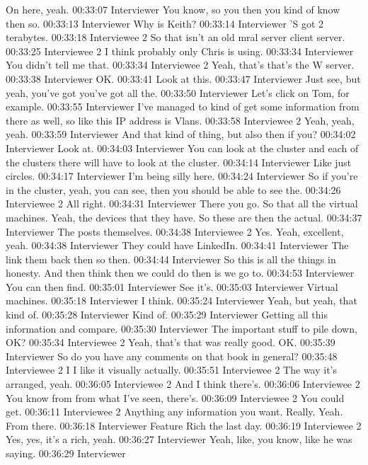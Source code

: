 On here, yeah.
00:33:07 Interviewer
You know, so you then you kind of know then so.
00:33:13 Interviewer
Why is Keith?
00:33:14 Interviewer
'S got 2 terabytes.
00:33:18 Interviewee 2 
So that isn't an old mral server client server.
00:33:25 Interviewee 2 
I think probably only Chris is using.
00:33:34 Interviewer
You didn't tell me that.
00:33:34 Interviewee 2 
Yeah, that's that's the W server.
00:33:38 Interviewer
OK.
00:33:41
Look at this.
00:33:47 Interviewer
Just see, but yeah, you've got you've got all the.
00:33:50 Interviewer
Let's click on Tom, for example.
00:33:55 Interviewer
I've managed to kind of get some information from there as well, so like this IP address is Vlans.
00:33:58 Interviewee 2 
Yeah, yeah, yeah.
00:33:59 Interviewer
And that kind of thing, but also then if you?
00:34:02 Interviewer
Look at.
00:34:03 Interviewer
You can look at the cluster and each of the clusters there will have to look at the cluster.
00:34:14 Interviewer
Like just circles.
00:34:17 Interviewer
I'm being silly here.
00:34:24 Interviewer
So if you're in the cluster, yeah, you can see, then you should be able to see the.
00:34:26 Interviewee 2 
All right.
00:34:31 Interviewer
There you go. So that all the virtual machines. Yeah, the devices that they have. So these are then the actual.
00:34:37 Interviewer
The posts themselves.
00:34:38 Interviewee 2 
Yes. Yeah, excellent, yeah.
00:34:38 Interviewer
They could have LinkedIn.
00:34:41 Interviewer
The link them back then so then.
00:34:44 Interviewer
So this is all the things in honesty. And then think then we could do then is we go to.
00:34:53 Interviewer
You can then find.
00:35:01 Interviewer
See it's.
00:35:03 Interviewer
Virtual machines.
00:35:18 Interviewer
I think.
00:35:24 Interviewer
Yeah, but yeah, that kind of.
00:35:28 Interviewer
Kind of.
00:35:29 Interviewer
Getting all this information and compare.
00:35:30 Interviewer
The important stuff to pile down, OK?
00:35:34 Interviewee 2 
Yeah, that's that was really good. OK.
00:35:39 Interviewer
So do you have any comments on that book in general?
00:35:48 Interviewee 2 
I I like it visually actually.
00:35:51 Interviewee 2 
The way it's arranged, yeah.
00:36:05 Interviewee 2 
And I think there's.
00:36:06 Interviewee 2 
You know from from what I've seen, there's.
00:36:09 Interviewee 2 
You could get.
00:36:11 Interviewee 2 
Anything any information you want. Really. Yeah. From there.
00:36:18 Interviewer
Feature Rich the last day.
00:36:19 Interviewee 2 
Yes, yes, it's a rich, yeah.
00:36:27 Interviewer
Yeah, like, you know, like he was saying.
00:36:29 Interviewer
